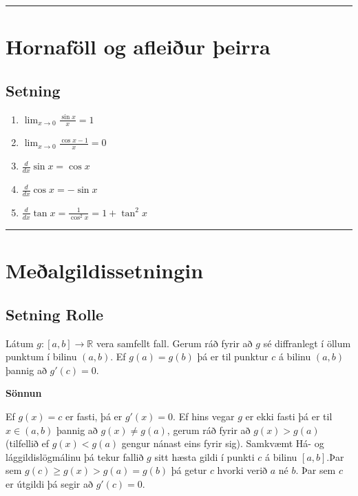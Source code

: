 \documentclass[a4paper,10pt,icelandic]{sphinxmanual}
\begin{document}
\bigskip\hrule{}\bigskip



\section{Hornaföll og afleiður þeirra}
\label{kafli03:hornafoll-og-afleiur-eirra}

\subsection{Setning}
\label{kafli03:id12}\begin{enumerate}
\item {} 
\(\displaystyle\lim_{x\rightarrow 0}\frac{\sin x}{x}=1\)

\item {} 
\(\displaystyle\lim_{x\rightarrow 0}\frac{\cos x-1}{x}=0\)

\item {} 
\(\displaystyle\frac{d}{dx}\sin x=\cos x\)

\item {} 
\(\displaystyle\frac{d}{dx}\cos x=-\sin x\)

\item {} 
\(\displaystyle\frac{d}{dx}\tan x=\frac{1}{\cos^2 x}=1+\tan^2 x\)

\end{enumerate}


\bigskip\hrule{}\bigskip



\section{Meðalgildissetningin}
\label{kafli03:mealgildissetningin}

\subsection{Setning Rolle}
\label{kafli03:rolle}\label{kafli03:index-6}\label{kafli03:setning-rolle}
Látum \(g:[a,b]\rightarrow{{\mathbb  R}}\) vera samfellt fall. Gerum
ráð fyrir að \(g\) sé diffranlegt í öllum punktum í bilinu
\((a,b)\). Ef \(g(a)=g(b)\) þá er til punktur \(c\) á bilinu
\((a,b)\) þannig að \(g'(c)=0\).

\textbf{Sönnun}

Ef \(g(x)=c\) er fasti, þá er \(g'(x)=0\). Ef hins vegar
\(g\) er ekki fasti þá er til \(x \in (a,b)\) þannig að
\(g(x)\neq g(a)\), gerum ráð fyrir að \(g(x)>g(a)\)
(tilfellið ef \(g(x)<g(a)\) gengur nánast eins fyrir sig).
Samkvæmt Há- og lággildislögmálinu
þá tekur fallið \(g\) sitt hæsta
gildi í punkti \(c\) á bilinu \([a,b]\).Þar sem
\(g(c)\geq g(x) >  g(a) = g(b)\) þá getur \(c\) hvorki verið
\(a\) né \(b\).
Þar sem \(c\)
er útgildi þá segir {\hyperref[kafli03:setning\string-3\string-5\string-2]{}} að \(g'(c)=0\).
\end{document}
